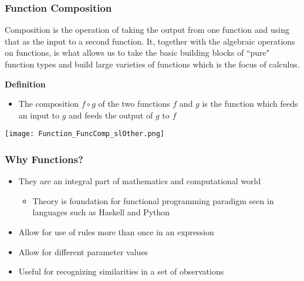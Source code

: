 \documentclass{beamer}
\begin{document}
\begin{frame}[fragile]\frametitle{Function Composition}
\begin{center} Composition is the operation of taking the output from one function and using that as the input to a second function. It, together with the algebraic operations on functions, is what allows us to take the basic building blocks of ``pure" function types and build large varieties of functions which is the focus of calculus. \end{center}

\begin{center} \textbf{Definition} \end{center}
\begin{itemize}
  \item The composition $f \circ g$ of the two functions $f$ and $g$ is the function which feeds an input to $g$ and feeds the output of $g$ to $f$
\end{itemize}

\begin{center}\texttt{[image: Function\_FuncComp\_slOther.png]} \end{center}

\end{frame}

\begin{frame}[fragile]\frametitle{Why Functions?}

\begin{itemize}
  \item They are an integral part of mathematics and computational world
    \begin{itemize}
      \item Theory is foundation for functional programming paradigm seen in languages such as Haskell and Python
    \end{itemize}
  \item Allow for use of rules more than once in an expression
  \item Allow for different parameter values
  \item Useful for recognizing similarities in a set of observations

\end{itemize}

\end{frame}
\end{document}
